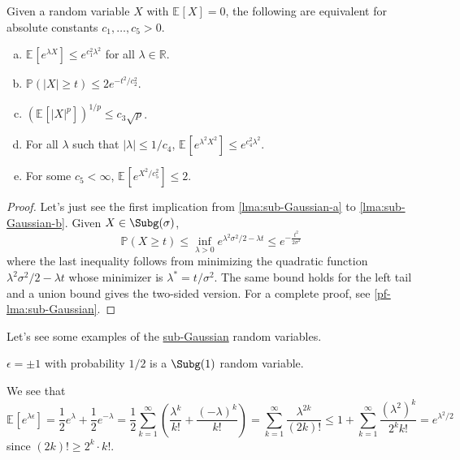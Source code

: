\begin{lemma}\label{lma:sub-Gaussian}
	Given a random variable \(X\) with \(\mathbb{E}_{}\left[X \right] =0\), the following are equivalent for absolute constants \(c_1, \dots , c_5 > 0\).
	\begin{enumerate}[(a)]
		\item\label{lma:sub-Gaussian-a} \(\mathbb{E}_{}\left[e^{\lambda X} \right] \leq e^{c_1^2 \lambda ^2}\) for all \(\lambda \in \mathbb{R} \).
		\item\label{lma:sub-Gaussian-b} \(\mathbb{P} (\vert X \vert \geq t) \leq 2 e^{- t^2 / c_2^2}\).
		\item\label{lma:sub-Gaussian-c} \(\left( \mathbb{E}_{}\left[\vert X \vert ^p \right]  \right)^{1 / p} \leq c_3 \sqrt{p}  \).
		\item\label{lma:sub-Gaussian-d} For all \(\lambda \) such that \(\vert \lambda  \vert \leq 1 / c_4 \), \(\mathbb{E}_{}\left[e^{\lambda ^2 X^2} \right] \leq e^{c_4^2 \lambda ^2} \).
		\item\label{lma:sub-Gaussian-e} For some \(c_5 < \infty \), \(\mathbb{E}_{}\left[e^{X^2 / c_5^2}  \right] \leq 2\).
	\end{enumerate}
\end{lemma}
\begin{proof}
	Let's just see the first implication from \autoref{lma:sub-Gaussian-a} to \autoref{lma:sub-Gaussian-b}. Given \(X \in \Subg(\sigma ) \),
	\[
		\mathbb{P} (X\geq t) \leq \inf _{\lambda > 0} e^{\lambda ^2 \sigma ^2 / 2 - \lambda t} \leq e^{-\frac{t^2}{2\sigma ^2}}
	\]
	where the last inequality follows from minimizing the quadratic function \(\lambda ^{2} \sigma ^{2} / 2 - \lambda t\) whose minimizer is \(\lambda ^{\ast} = t / \sigma ^{2} \). The same bound holds for the left tail and a union bound gives the two-sided version. For a complete proof, see \autoref{pf-lma:sub-Gaussian}.
\end{proof}

Let's see some examples of the \hyperref[def:sub-Gaussian]{sub-Gaussian} random variables.

\begin{eg}\label{eg:Rademacher-random-varaible}
	\(\epsilon = \pm 1\) with probability \(1 / 2\) is a \(\Subg(1) \) random variable.
\end{eg}
\begin{explanation}
	We see that
	\[
		\mathbb{E}_{}\left[e^{\lambda \epsilon } \right]
		= \frac{1}{2} e^\lambda + \frac{1}{2} e^{-\lambda }
		= \frac{1}{2} \sum_{k=1}^{\infty} \left( \frac{\lambda ^k}{k!} + \frac{(-\lambda )^k}{k!} \right)
		= \sum_{k=1}^{\infty} \frac{\lambda ^{2k}}{(2k)!}
		\leq 1 + \sum_{k=1}^{\infty} \frac{(\lambda ^2)^k}{2^k k!}
		= e^{\lambda ^2 / 2}
	\]
	since \((2k)! \geq 2^k \cdot k!\).
\end{explanation}

